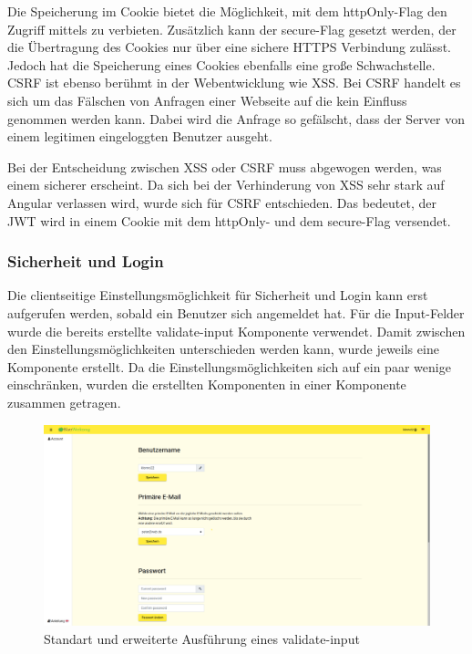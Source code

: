 Die Speicherung im Cookie bietet die Möglichkeit, mit dem httpOnly-Flag den Zugriff mittels \JS zu verbieten. Zusätzlich kann der secure-Flag gesetzt werden, der die Übertragung des Cookies nur über eine sichere \gls{HTTPS} Verbindung zulässt. Jedoch hat die Speicherung eines Cookies ebenfalls eine gro{\ss}e Schwachstelle. \gls{CSRF} ist ebenso berühmt in der Webentwicklung wie \gls{XSS}. Bei \gls{CSRF} handelt es sich um das Fälschen von Anfragen einer Webseite auf die kein Einfluss genommen werden kann. Dabei wird die Anfrage so gefälscht, dass der Server von einem legitimen eingeloggten Benutzer ausgeht.

Bei der Entscheidung zwischen \gls{XSS} oder \gls{CSRF} muss abgewogen werden, was einem sicherer erscheint. Da sich bei der Verhinderung von \gls{XSS} sehr stark auf Angular verlassen wird, wurde sich für \gls{CSRF} entschieden. Das bedeutet, der \gls{JWT} wird in einem Cookie mit dem httpOnly- und dem secure-Flag versendet.

\subsubsection{Sicherheit und Login}
\label{sec:client-security-login}
Die clientseitige Einstellungsmöglichkeit für Sicherheit und Login kann erst aufgerufen werden, sobald ein Benutzer sich angemeldet hat. Für die Input-Felder wurde die bereits erstellte validate-input Komponente verwendet. Damit zwischen den Einstellungsmöglichkeiten unterschieden werden kann, wurde jeweils eine Komponente erstellt. Da die Einstellungsmöglichkeiten sich auf ein paar wenige einschränken, wurden die erstellten Komponenten in einer Komponente zusammen getragen.


\begin{figure}
	\centering
	\includegraphics[width=\textwidth]{graphics/account-settings-1.png}
	\caption{Standart und erweiterte Ausführung eines validate-input}
	\label{fig:account_settings_1}
\end{figure}

